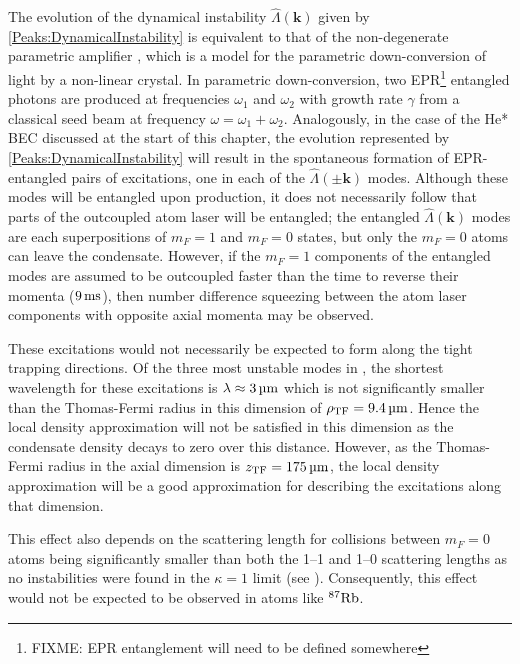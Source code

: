 The evolution of the dynamical instability $\hat{\Lambda}(\bm{k})$ given by \eqref{Peaks:DynamicalInstability} is equivalent to that of the non-degenerate parametric amplifier \citep{WallsMilburn}, which is a model for the parametric down-conversion of light by a non-linear crystal. In parametric down-conversion, two EPR\footnote{FIXME: EPR entanglement will need to be defined somewhere} entangled photons are produced at frequencies $\omega_1$ and $\omega_2$ with growth rate $\gamma$ from a classical seed beam at frequency $\omega = \omega_1 + \omega_2$. Analogously, in the case of the He* BEC discussed at the start of this chapter, the evolution represented by \eqref{Peaks:DynamicalInstability} will result in the spontaneous formation of EPR-entangled pairs of excitations, one in each of the $\hat{\Lambda}(\pm \bm{k})$ modes. Although these modes will be entangled upon production, it does not necessarily follow that parts of the outcoupled atom laser will be entangled; the entangled $\hat{\Lambda}(\bm{k})$ modes are each superpositions of $m_F=1$ and $m_F=0$ states, but only the $m_F=0$ atoms can leave the condensate. However, if the $m_F=1$ components of the entangled modes are assumed to be outcoupled faster than the time to reverse their momenta ($\unit[9]{ms}$), then number difference squeezing between the atom laser components with opposite axial momenta may be observed.

These excitations would not necessarily be expected to form along the tight trapping directions. Of the three most unstable modes in , the shortest wavelength for these excitations is $\lambda \approx \unit[3]{\micro m}$ which is not significantly smaller than the Thomas-Fermi radius in this dimension of $\rho_\text{TF} = \unit[9.4]{\micro m}$. Hence the local density approximation will not be satisfied in this dimension as the condensate density decays to zero over this distance. However, as the Thomas-Fermi radius in the axial dimension is $z_\text{TF} = \unit[175]{\micro m}$, the local density approximation will be a good approximation for describing the excitations along that dimension.

This effect also depends on the scattering length for collisions between $m_F=0$ atoms being significantly smaller than both the 1--1 and 1--0 scattering lengths as no instabilities were found in the $\kappa = 1$ limit (see ). 
Consequently, this effect would not be expected to be observed in atoms like $\nucl{87}{}{Rb}$.

